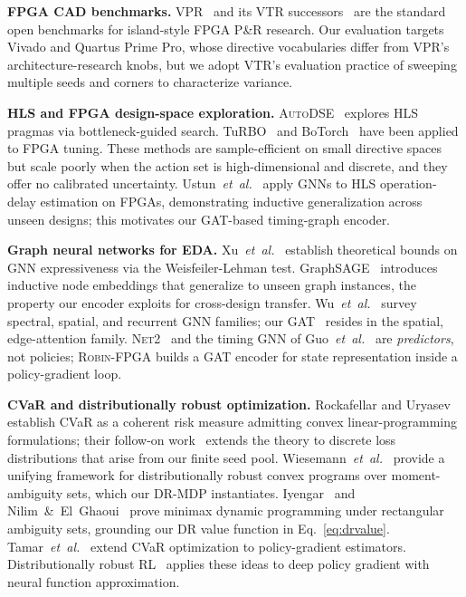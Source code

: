 \documentclass[journal]{IEEEtran}
\begin{document}
\textbf{FPGA CAD benchmarks.} VPR~\cite{betz1997vpr} and its VTR successors~\cite{luu2014vtr7,murray2020vtr} are the standard open benchmarks for island-style FPGA P\&R research. Our evaluation targets Vivado and Quartus Prime Pro, whose directive vocabularies differ from VPR's architecture-research knobs, but we adopt VTR's evaluation practice of sweeping multiple seeds and corners to characterize variance.

\textbf{HLS and FPGA design-space exploration.} \textsc{AutoDSE}~\cite{sohrabizadeh2022autodse} explores HLS pragmas via bottleneck-guided search. TuRBO~\cite{eriksson2019turbo} and BoTorch~\cite{balandat2020botorch} have been applied to FPGA tuning. These methods are sample-efficient on small directive spaces but scale poorly when the action set is high-dimensional and discrete, and they offer no calibrated uncertainty. Ustun~\emph{et~al.}~\cite{ustun2020accurate} apply GNNs to HLS operation-delay estimation on FPGAs, demonstrating inductive generalization across unseen designs; this motivates our GAT-based timing-graph encoder.

\textbf{Graph neural networks for EDA.} Xu~\emph{et~al.}~\cite{xu2019powerful} establish theoretical bounds on GNN expressiveness via the Weisfeiler-Lehman test. GraphSAGE~\cite{hamilton2017inductive} introduces inductive node embeddings that generalize to unseen graph instances, the property our encoder exploits for cross-design transfer. Wu~\emph{et~al.}~\cite{wu2021survey} survey spectral, spatial, and recurrent GNN families; our GAT~\cite{velickovic2018gat} resides in the spatial, edge-attention family. \textsc{Net2}~\cite{barboza2019net2} and the timing GNN of Guo~\emph{et~al.}~\cite{guo2022timing} are \emph{predictors}, not policies; \textsc{Robin-FPGA} builds a GAT encoder for state representation inside a policy-gradient loop.

\textbf{CVaR and distributionally robust optimization.} Rockafellar and Uryasev~\cite{rockafellar2000cvar} establish CVaR as a coherent risk measure admitting convex linear-programming formulations; their follow-on work~\cite{rockafellar2002cvar2} extends the theory to discrete loss distributions that arise from our finite seed pool. Wiesemann~\emph{et~al.}~\cite{wiesemann2014distributionally} provide a unifying framework for distributionally robust convex programs over moment-ambiguity sets, which our DR-MDP instantiates. Iyengar~\cite{iyengar2005robust} and Nilim~\&~El~Ghaoui~\cite{nilim2005robust} prove minimax dynamic programming under rectangular ambiguity sets, grounding our DR value function in Eq.~\eqref{eq:drvalue}. Tamar~\emph{et~al.}~\cite{tamar2015cvar} extend CVaR optimization to policy-gradient estimators. Distributionally robust RL~\cite{rigter2022rambo,sinha2017certifying} applies these ideas to deep policy gradient with neural function approximation.
\end{document}
